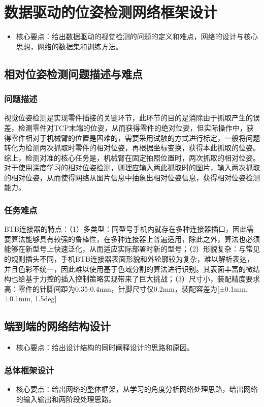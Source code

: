 \documentclass{Diploma}
\begin{document}
\chapter{数据驱动的位姿检测网络框架设计}
\begin{itemize}
  \item 核心要点：给出数据驱动的视觉检测的问题的定义和难点，网络的设计与核心思想，网络的数据集和训练方法。
\end{itemize}

\section{相对位姿检测问题描述与难点}

\subsection{问题描述}
视觉位姿检测是实现零件插接的关键环节，此环节的目的是消除由于抓取产生的误差，检测零件对TCP末端的位姿，从而获得零件的绝对位姿，但实际操作中，获得零件相对于机械臂的位置是困难的，需要采用试触的方式进行标定，一般将问题转化为检测两次抓取时零件的相对位姿，再根据坐标变换，获得本此抓取的位姿。综上，检测对准的核心任务是，机械臂在固定拍照位置时，两次抓取的相对位姿。对于使用深度学习的相对位姿检测，则理应输入两此抓取时的图片，输入两次抓取的相对位姿，从而使得网络从图片信息中抽象出相对位姿信息，获得相对位姿检测能力。
\subsection{任务难点}
BTB连接器的特点：（1）多类型：同型号手机内就存在多种连接器插口，因此需要算法能够具有较强的鲁棒性，在多种连接器上普遍适用，除此之外，算法也必须能够在新型号上快速泛化，从而适应实际部署时新的型号；（2）形貌复杂：与常见的规则插头不同，手机BTB连接器表面形貌和外轮廓较为复杂，难以解析表达，并且色彩不统一，因此难以使用基于色域分割的算法进行识别。其表面丰富的微结构也给基于力控的插入控制策略实现带来了巨大挑战；（3）尺寸小，装配精度要求高：零件的针脚间距为0.35-0.4mm，针脚尺寸仅0.2mm，装配容差为[±0.1mm, ±0.1mm, 1.5deg]

\section{端到端的网络结构设计}
\begin{itemize}
  \item 核心要点：给出设计结构的同时阐释设计的思路和原因。
\end{itemize}
\subsection{总体框架设计}
\begin{itemize}
  \item 核心要点：给出网络的整体框架，从学习的角度分析网络处理思路，给出网络的输入输出和两阶段处理思路。
\end{itemize}
\end{document}

